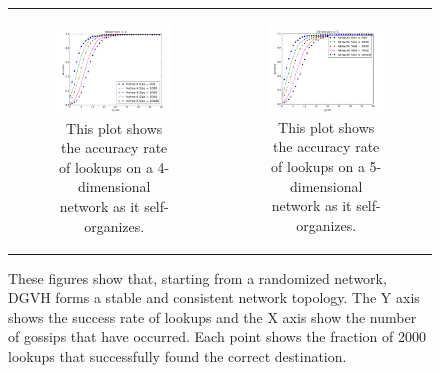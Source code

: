 \begin{figure}
\begin{tabular}{cc}
		\begin{subfigure}{0.5\columnwidth}
			\includegraphics[width=\linewidth]{figs/conv_d4}
			\caption{This plot shows the accuracy rate of lookups on a 4-dimensional network as it self-organizes.}
			\label{fig:conv4}
		\end{subfigure} &


		\begin{subfigure}{0.5\columnwidth}
			\includegraphics[width=\linewidth]{figs/conv_d5}
			\caption{This plot shows the accuracy rate of lookups on a 5-dimensional network as it self-organizes.}
			\label{fig:conv5}
		\end{subfigure}

	\end{tabular}
	\caption[Performance of DGVH forming a topology]{These figures show that, starting from a randomized network, DGVH forms a stable and consistent network topology.
		The Y axis shows the success rate of lookups and the X axis show the number of gossips that have occurred.
		Each point shows the fraction of 2000 lookups that successfully found the correct destination.}
	
	\label{fig:conv}

\end{figure}

